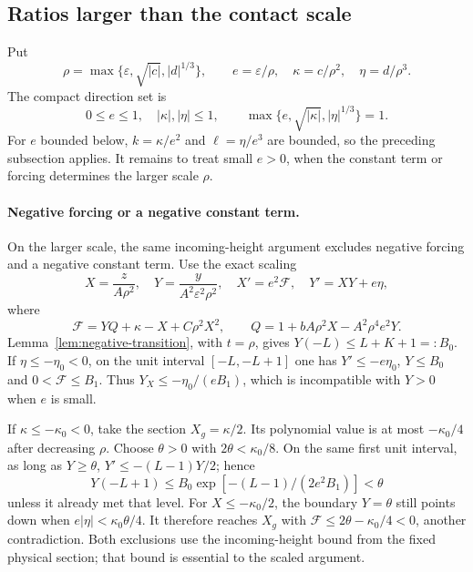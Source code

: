 \subsection{Ratios larger than the contact scale}\label{subsec:simple-radial}

Put
\[
 \rho=\max\{\varepsilon,\sqrt{|c|},|d|^{1/3}\},\qquad
 e=\varepsilon/\rho,\quad \kappa=c/\rho^2,\quad\eta=d/\rho^3.
\]
The compact direction set is
\begin{equation}\label{eq:simple-direction-set}
 0\le e\le1,\quad |\kappa|,|\eta|\le1,\qquad
 \max\{e,\sqrt{|\kappa|},|\eta|^{1/3}\}=1.
\end{equation}
For $e$ bounded below, $k=\kappa/e^2$ and $\ell=\eta/e^3$ are bounded,
so the preceding subsection applies. It remains to treat small $e>0$,
when the constant term or forcing determines the larger scale $\rho$.

\paragraph{Negative forcing or a negative constant term.}
On the larger scale, the same incoming-height argument excludes
negative forcing and a negative constant term. Use the exact scaling
\[
 X=\frac{z}{A\rho^2},\quad
 Y=\frac{y}{A^2\varepsilon^2\rho^2},\quad
 X'=e^2\mathcal F,\quad Y'=XY+e\eta,
\]
where
\begin{equation}\label{eq:simple-radial-system}
 \mathcal F=YQ+\kappa-X+C\rho^2X^2,\qquad
 Q=1+bA\rho^2X-A^2\rho^4e^2Y.
\end{equation}
Lemma~\ref{lem:negative-transition}, with $t=\rho$, gives
$Y(-L)\le L+K+1=:B_0$.
If $\eta\le-\eta_0<0$, on the unit interval $[-L,-L+1]$
one has $Y'\le-e\eta_0$, $Y\le B_0$ and
$0<\mathcal F\le B_1$.  Thus
$Y_X\le-\eta_0/(eB_1)$, which is incompatible with $Y>0$ when
$e$ is small.

If $\kappa\le-\kappa_0<0$, take the section $X_g=\kappa/2$.
Its polynomial value is at most $-\kappa_0/4$ after decreasing $\rho$.
Choose $\theta>0$ with $2\theta<\kappa_0/8$.
On the same first unit interval, as long as $Y\ge\theta$,
$Y'\le-(L-1)Y/2$; hence
\[
 Y(-L+1)\le B_0\exp[-(L-1)/(2e^2B_1)]<\theta
\]
unless it already met that level.
For $X\le-\kappa_0/2$, the boundary $Y=\theta$ still points down
when $e|\eta|<\kappa_0\theta/4$.
It therefore reaches $X_g$ with
$\mathcal F\le2\theta-\kappa_0/4<0$, another contradiction.
Both exclusions use the incoming-height bound from the fixed physical
section; that bound is essential to the scaled argument.

